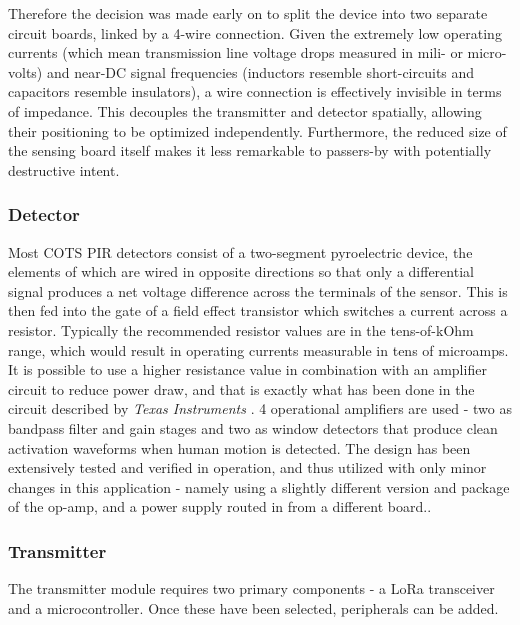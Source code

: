 \documentclass[10pt,nocopyrightspace]{ewsn-proc}
\begin{document}
Therefore the decision was made early on to split the device into two separate circuit boards, linked by a 4-wire connection. Given the extremely low operating currents (which mean transmission line voltage drops measured in mili- or micro- volts) and near-DC signal frequencies (inductors resemble short-circuits and capacitors resemble insulators), a wire connection is effectively invisible in terms of impedance. This decouples the transmitter and detector spatially, allowing their positioning to be optimized independently. Furthermore, the reduced size of the sensing board itself makes it less remarkable to passers-by with potentially destructive intent.

\subsubsection{Detector}
Most COTS PIR detectors consist of a two-segment pyroelectric device, the elements of which are wired in opposite directions so that only a differential signal produces a net voltage difference across the terminals of the sensor. This is then fed into the gate of a field effect transistor which switches a current across a resistor. Typically the recommended resistor values are in the tens-of-kOhm range, which would result in operating currents measurable in tens of microamps. It is possible to use a higher resistance value in combination with an amplifier circuit to reduce power draw, and that is exactly what has been done in the circuit described by \textit{Texas Instruments} \cite{TI:PIR, TI:APP}. 4 operational amplifiers are used - two as bandpass filter and gain stages and two as window detectors that produce clean activation waveforms when human motion is detected. The design has been extensively tested and verified in operation, and thus utilized with only minor changes in this application - namely using a slightly different version and package of the op-amp, and a power supply routed in from a different board.. 

\subsubsection{Transmitter}
The transmitter module requires two primary components - a LoRa transceiver and a microcontroller. Once these have been selected, peripherals can be added.
\end{document}
